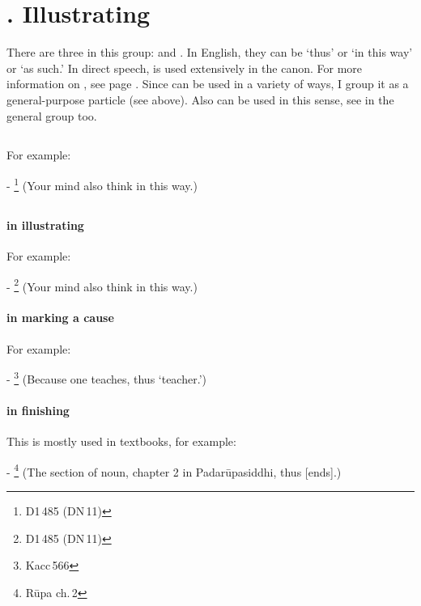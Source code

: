 \label{nipgrp8}
\section*{. Illustrating}

There are three in this group:  and . In English, they can be `thus' or `in this way' or `as such.' In direct speech,  is used extensively in the canon. For more information on , see page \pageref{par:iti}. Since  can be used in a variety of ways, I group it as a general-purpose particle (see above). Also  can be used in this sense, see in the general group too.

\subsection*{}\label{nip:itthadm}
For example:\par
- \footnote{D1\,485 (DN\,11)} (Your mind also think in this way.) \par

\subsection*{}\label{nip:iti}
\paragraph*{ in illustrating} For example:\par
- \footnote{D1\,485 (DN\,11)} (Your mind also think in this way.) \par
\paragraph*{ in marking a cause} For example:\par
- \footnote{Kacc\,566} (Because one teaches, thus `teacher.') \par
\paragraph*{ in finishing} This is mostly used in textbooks, for example:\par
- \footnote{R\=upa ch.\,2} (The section of noun, chapter 2 in Padar\=upasiddhi, thus [ends].) \par

